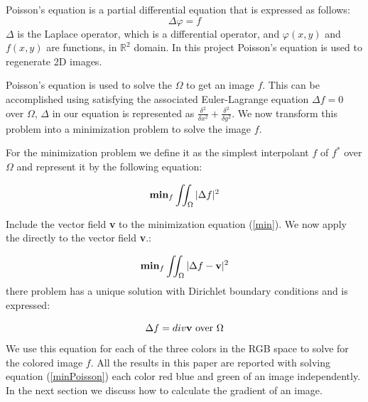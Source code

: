 \documentclass[10pt,twopage]{acmsiggraph}
\begin{document}
Poisson's equation is a partial differential equation that is expressed as follows:
\begin{equation} 
\ensuremath{\Delta \varphi = f}
\end{equation}
\ensuremath{\Delta} is the Laplace operator, which is a differential operator, and \ensuremath{ \varphi(x,y) } and $ f(x,y) $ are functions, in $\mathbb{R}^2$ domain. In this project Poisson's equation is used to regenerate 2D images. 






Poisson's equation is used to solve the \ensuremath{\Omega} to get an image $f$. This can be accomplished using satisfying the associated Euler-Lagrange equation \ensuremath{\Delta f = 0} over \ensuremath{\Omega}, \ensuremath{\Delta} in our equation is represented as \ensuremath{\frac{\delta^2}{\delta x^2} + \frac{\delta^2}{\delta y^2}}. We now transform this problem into a minimization problem to solve the image $f$.

For the minimization problem we define it as the simplest interpolant $f$ of $f^*$ over \ensuremath{\Omega} and represent it by the following equation:

\begin{equation}
\ensuremath{{\bf min}_f \iint_{\Omega}{|\Delta f|^2}}
\label{min}
\end{equation}

Include the vector field {\bf v} to the minimization equation (\ref{min}). We now apply the directly to the vector field {\bf v}.:

\begin{equation}
{\bf min}_f \iint_{\Omega}{|\Delta f - {\bf v}|^2}
\label{minPoisson}
\end{equation}
there problem has a unique solution with Dirichlet boundary conditions and is expressed:

\begin{equation}
\Delta f = div {\bf v} \mbox{ over \ensuremath{\Omega}}
\label{poissonEqn}
\end{equation}
We use this equation for each of the three colors in the RGB space to solve for the colored image $f$. All the results in this paper are reported with solving equation (\ref{minPoisson}) each color red blue and green of an image independently. In the next section we discuss how to calculate the gradient of an image.
\end{document}
